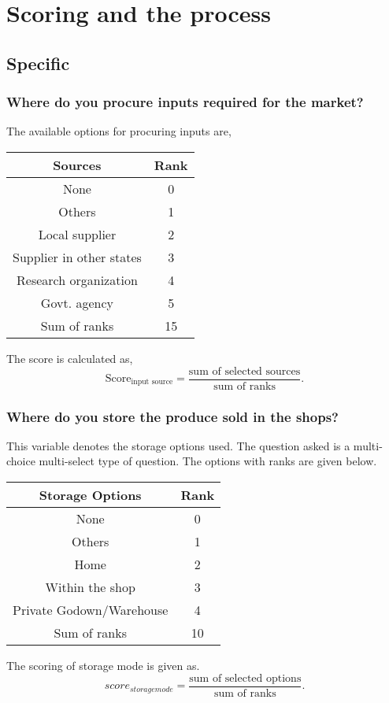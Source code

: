 \documentclass[oneside,twocolumn]{article}
\newcommand{\tsub}[2]{\text{#1}_{\text{#2}}}
\newenvironment{ttable}
               {\begin{center}
                 \begin{tabular}{c|c}
                   \hline
                   }
                   { \\ \hline
                 \end{tabular}
               \end{center}
               }
\begin{document}
\section{Scoring and the process}
\subsection{Specific}
\subsubsection{Where do you procure inputs required for the market?}
The available options for procuring inputs are,
\begin{ttable}
  Sources & Rank \\ \hline
  None & 0 \\
  Others & 1 \\
  Local supplier & 2 \\
  Supplier in other states & 3 \\
  Research organization & 4 \\
  Govt. agency & 5 \\ \hline
  Sum of ranks & 15
\end{ttable}

The score is calculated as,
\[
\tsub{Score}{input source} = \dfrac{\text{sum of selected sources}}{\text{sum of ranks}}.
\]

\subsubsection{Where do you store the produce sold in the shops?}
This variable denotes the storage options used. The question asked is a
multi-choice multi-select type of question. The options with ranks are
given below.
\begin{center}
  \begin{tabular}{c|c}
    \hline
    Storage Options & Rank \\ \hline
    None & 0 \\
    Others & 1 \\
    Home & 2 \\
    Within the shop & 3 \\
    Private Godown/Warehouse & 4 \\ \hline
    Sum of ranks & 10 \\ \hline
  \end{tabular}
\end{center}
The scoring of storage mode is given as.
\[
score_{storage mode} = \dfrac{\text{sum of selected options}}{\text{sum of ranks}}.
\]
\end{document}

